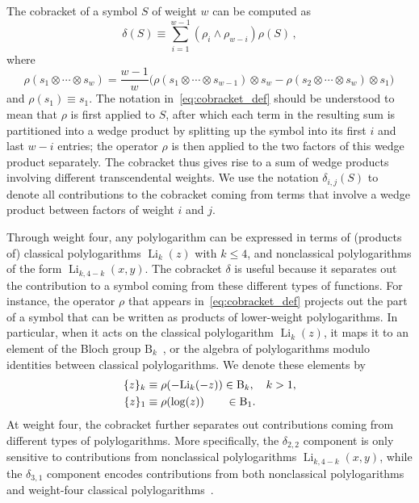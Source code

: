 \documentclass[11pt]{article}
\DeclareMathOperator{\Li}{Li}
\begin{document}
The cobracket of a symbol $S$ of weight $w$ can be computed as
\begin{equation} \label{eq:cobracket_def}
\delta(S) \equiv \sum_{i=1}^{w-1} (\rho_i \wedge \rho_{w-i})\rho(S) \, ,
\end{equation}
where
\begin{equation}
\rho(s_1 \otimes \cdots \otimes s_w ) = \frac{w-1}{w} \Big(\rho(s_1 \otimes \cdots \otimes s_{w-1}) \otimes s_w - \rho(s_2 \otimes \cdots \otimes s_{w}) \otimes s_1 \Big) \, 
\end{equation}
and $\rho(s_1) \equiv s_1$. The notation in~\eqref{eq:cobracket_def} should be understood to mean that $\rho$ is first applied to $S$, after which each term in the resulting sum is partitioned into a wedge product by splitting up the symbol into its first $i$ and last $w{-}i$ entries; the operator $\rho$ is then applied to the two factors of this wedge product separately. The cobracket thus gives rise to a sum of wedge products involving different transcendental weights. We use the notation $\delta_{i,j}(S)$ to denote all contributions to the cobracket coming from terms that involve a wedge product between factors of weight $i$ and $j$. 

Through weight four, any polylogarithm can be expressed in terms of (products of) classical polylogarithms $\Li_k(z)$ with $k \leq 4$, and nonclassical polylogarithms of the form $\Li_{k,4-k}(x,y)$. The cobracket $\delta$ is useful because it separates out the contribution to a symbol coming from these different types of functions. For instance, the operator $\rho$ that appears in~\eqref{eq:cobracket_def} projects out the part of a symbol that can be written as products of lower-weight polylogarithms. In particular, when it acts on the classical polylogarithm $\Li_k(z)$, it maps it to an element of the Bloch group $\text{B}_k$~\cite{Bloch:2000, Suslin:1990}, or the algebra of polylogarithms modulo identities between classical polylogarithms. We denote these elements by
\begin{align}
 \{ z \}_k  &\equiv \rho(-\text{Li}_k(-z)) \in \text{B}_k, \quad k>1, \\
 \{ z \}_1  &\equiv \rho(\log(z)) \hspace{.675cm} \in \text{B}_1.
\end{align}
At weight four, the cobracket further separates out contributions coming from different types of polylogarithms. More specifically, the $\delta_{2,2}$ component is only sensitive to contributions from nonclassical polylogarithms $\Li_{k,4-k}(x,y)$, while the $\delta_{3,1}$ component encodes contributions from both nonclassical polylogarithms and weight-four classical polylogarithms~\cite{G91a,2008arXiv0809.3984D,GanglPolylogIdentities,2018arXiv180107816G,2018arXiv180308585G}. 
\end{document}
